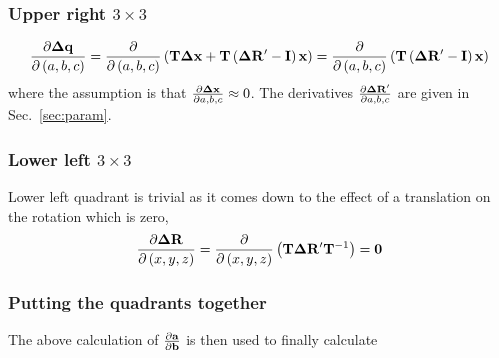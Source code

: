 \documentclass{article}
\def\vec#1{\ensuremath{\mathrm{\bf #1}}}
\def\partder#1#2{\ensuremath{\frac{\partial #1}{\partial #2}}}
\begin{document}
\subsubsection*{Upper right $3\times3$} 
\begin {equation}
\partder{\vec{\Delta q}}{\left(a,b,c\right)} =  
\partder{}{\left(a,b,c\right)} \left (  \vec{T} \vec{\Delta x} + \vec{T}\left ( \vec{\Delta R'}  - \vec{I}  \right)\vec{x} \right) =
\partder{}{\left(a,b,c\right)} \left ( \vec{T}\left ( \vec{\Delta R'}  - \vec{I}  \right) \vec{x} \right) 
\end{equation}
where the assumption is that $\partder{\vec{\Delta x}}{a,b,c} \approx 0$. The derivatives 
$\partder{\vec{\Delta R'}}{a,b,c}$ are given in Sec.~\ref{sec:param}.   


\subsubsection*{Lower left $3\times3$} 
Lower left quadrant is trivial as it comes down to the effect of a translation on the rotation which is zero,
\begin {equation}
\partder{\vec{\Delta R}}{\left(x,y,z\right)} =  
\partder{}{\left(x,y,z\right)} \left (  \vec{T} \vec{\Delta R'} \vec{T}^{-1} \right ) = \vec{0}
\end{equation}


\subsubsection*{Putting the quadrants together}
The above calculation of  $\partder{\vec{a}}{\vec{b}}$ is then used to finally calculate 
\end{document}
